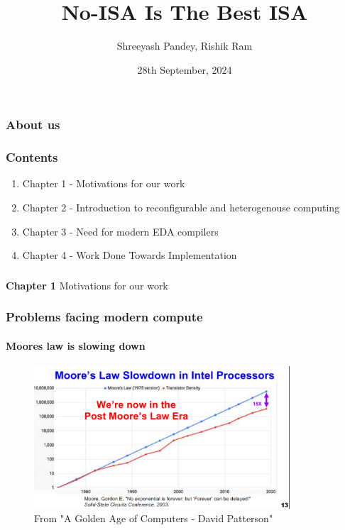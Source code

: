 \documentclass{beamer}
\title{No-ISA Is The Best ISA}
\subtitle{}
\author{Shreeyash Pandey, Rishik Ram}
\institute{Vicharak, India @ vicharak.in}
\date{28th September, 2024}
\begin{document}
\begin{frame}
\titlepage
\end{frame}

\begin{frame}[fragile]
\frametitle{About us}

\framesubtitle{}
\end{frame}

\begin{frame}[fragile]
\frametitle{Contents}

  \begin{enumerate}
    \item Chapter 1 - Motivations for our work
    \item Chapter 2 - Introduction to reconfigurable and heterogenouse computing
    \item Chapter 3 - Need for modern EDA compilers
    \item Chapter 4 - Work Done Towards Implementation  
  \end{enumerate}
\end{frame}

\begin{frame}[c,fragile]
  \frametitle{}
  \centering
  \textbf{Chapter 1}
  \centering
  Motivations for our work
\end{frame}

\begin{frame}[fragile]
\frametitle{Problems facing modern compute}
\framesubtitle{Moores law is slowing down}

  \begin{figure}
    \centering
    \includegraphics[width=0.85\textwidth]{mooreslaw.png}
    \caption{From "A Golden Age of Computers - David Patterson"}
  \end{figure}

\end{frame}
\end{document}
